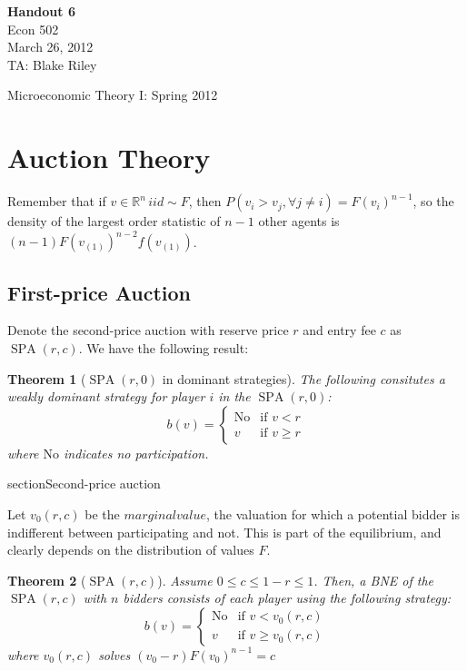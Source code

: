 \documentclass[letter, 10pt]{article}
\newtheorem{theorem}{Theorem}[section]
\theoremstyle{definition}
\newcommand{\R}{\mathbb{R}}
\DeclareMathOperator{\SPA}{SPA}
\begin{document}
\begin{spacing}{1.1}

\noindent
\textbf{Handout 6} \\
Econ 502 \\
March 26, 2012 \\
TA: Blake Riley \\

\begin{center}
{\Large Microeconomic Theory I: Spring 2012}
\end{center}

\section{Auction Theory}

Remember that if $v\in \R^n\,iid \sim F$, then
$P(v_i>v_j, \forall j \ne i) = F(v_i)^{n-1}$, so
the density of the largest order statistic of $n-1$ other
agents is $(n-1)F(v_{(1)})^{n-2} f(v_{(1)})$.


\subsection{First-price Auction}

Denote the second-price auction with reserve price $r$
and entry fee $c$ as $\SPA(r,c)$. We have the following
result:

\begin{theorem}[$\SPA(r,0)$ in dominant strategies] The
  following consitutes a weakly dominant strategy for
  player $i$ in the $\SPA(r,0)$:
  \begin{equation}
    b(v) =
    \begin{cases}
       \mathrm{No} & \mbox{if } v < r \\
      v & \mbox{if } v \ge r
    \end{cases}
  \end{equation}
  where $ \mathrm{No}$ indicates no participation.  
\end{theorem}
section{Second-price auction}

Let $v_0(r,c)$ be the $marginal value$, the valuation for
which a potential bidder is indifferent between
participating and not. This is part of the equilibrium,
and clearly depends on the distribution of values $F$.

\begin{theorem}[$\SPA(r,c)$]
  Assume $0 \le c \le 1-r \le 1$. Then, a BNE of
  the $\SPA(r,c)$ with $n$ bidders consists of each player using the
  following strategy:
    \begin{equation}
    b(v) =
    \begin{cases}
      \mathrm{No} & \mbox{if } v < v_0(r,c) \\
      v & \mbox{if } v \ge v_0(r,c)
    \end{cases}
  \end{equation}
  where $v_0(r,c)$ solves $(v_0 - r)F(v_0)^{n-1} = c$ 
\end{theorem}


\end{spacing}
\end{document}
